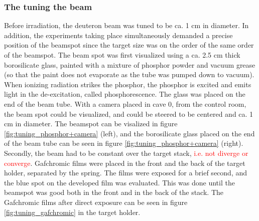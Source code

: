 \subsubsection{The tuning the beam}
Before irradiation, the deuteron beam was tuned to be ca. 1 cm in diameter. In addition, the experiments taking place simultaneously demanded a precise position of the beamspot since the target size was on the order of the same order of the beamspot. The beam spot was first visualized using a ca. 2.5 cm thick borosilicate glass, painted with a mixture of phosphor powder and vacuum grease (so that the paint does not evaporate as the tube was pumped down to vacuum). When ionizing radiation strikes the phosphor, the phosphor is excited and emits light in the de-excitation, called phosphorescence.  The glass was placed on the end of the beam tube. With a camera placed in cave 0, from the control room, the beam spot could be visualized, and could be steered to be centered and ca. 1 cm in diameter. The beamspot can be visalized in figure \ref{fig:tuning_phosphor+camera} (left), and the borosilicate glass placed on the end of the beam tube can be seen in figure \ref{fig:tuning_phosphor+camera} (right). Secondly, the beam had to be constant over the target stack, \textcolor{red}{i.e. not diverge or converge}. Gafchromic films were placed in the front and the back of the target holder, separated by the spring. The films were exposed for a brief second, and the blue spot on the developed film was evaluated. This was done until the beamspot was good both in the front and in the back of the stack. The Gafchromic films after direct exposure can be seen in figure \ref{fig:tuning_gafchromic} in the target holder.  \\

